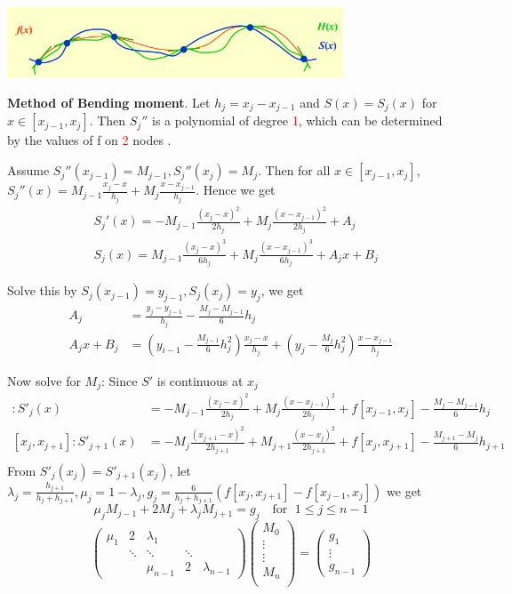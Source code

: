\documentclass[11pt]{article}
\begin{document}
\includegraphics[width=100mm]{CubicSpline}

\textbf{Method of Bending moment}. Let \(h_j=x_j-x_{j-1}\) and \(S(x)=S_j(x)\) for
\(x\in[x_{j-1}, x_j]\). Then \(S_j''\) is a polynomial of degree
\textcolor{red}{1}, which can be determined by the values of f on
\textcolor{red}{2} nodes .

Assume \(S_j''(x_{j-1})=M_{j-1},S_j''(x_j)=M_j\). Then for all
\(x\in[x_{j-1},x_j]\),
\(S_j''(x)=M_{j-1}\frac{x_j-x}{h_j}+M_j\frac{x-x_{j-1}}{h_j}\). Hence we get
\begin{align*}
&S_j'(x)=-M_{j-1}\frac{(x_j-x)^2}{2h_j}+M_j\frac{(x-x_{j-1})^2}{2h_j}+A_j\\
&S_j(x)=M_{j-1}\frac{(x_j-x)^3}{6h_j}+M_j\frac{(x-x_{j-1})^3}{6h_j}+A_jx+B_j
\end{align*}

Solve this by \(S_j(x_{j-1})=y_{j-1},S_j(x_j)=y_j\), we get
\begin{align*}
A_j&=\frac{y_j-y_{j-1}}{h_j}-\frac{M_j-M_{j-1}}{6}h_j\\
A_jx+B_j&=(y_{i-1}-\frac{M_{j-1}}{6}h_j^2)\frac{x_j-x}{h_j}+ 
(y_j-\frac{M_j}{6}h_j^2)\frac{x-x_{j-1}}{h_j}
\end{align*}

Now solve for \(M_j\): Since \(S'\) is continuous at \(x_j\)
 \begin{align*}
[x_{j-1},x_j]:S'_j(x)&=-M_{j-1}\frac{(x_j-x)^2}{2h_j}+M_j\frac{(x-x_{j-1})^2}{2h_j}
                       +f[x_{j-1},x_j]-\frac{M_j-M_{j-1}}{6}h_j\\
[x_j,x_{j+1}]:S'_{j+1}(x)&=-M_j\frac{(x_{j+1}-x)^2}{2h_{j+1}}+M_{j+1}
\frac{(x-x_j)^2}{2h_{j+1}}+f[x_j,x_{j+1}]-\frac{M_{j+1}-M_j}{6}h_{j+1}\\
\end{align*}
From \(S'_j(x_j)=S'_{j+1}(x_j)\), let \(\lambda_j=\frac{h_{j+1}}{h_j+h_{j+1}},
   \mu_j=1-\lambda_j,g_j=\frac{6}{h_j+h_{j+1}}(f[x_j,x_{j+1}]-f[x_{j-1},x_j])\)
we get
\begin{equation*}
\mu_jM_{j-1}+2M_j+\lambda_jM_{j+1}=g_j\quad\text{for } \;1\le j\le n-1
\end{equation*}
\begin{equation*}
\begin{pmatrix}
\mu_1 & 2 & \lambda_1 &&\\
& \ddots &\ddots &\ddots &\\
&&\mu_{n-1}&2&\lambda_{n-1}
\end{pmatrix}
\begin{pmatrix}
M_0\\
\vdots\\
\vdots\\
M_n\\
\end{pmatrix}=
\begin{pmatrix}
g_1\\
\vdots\\
g_{n-1}
\end{pmatrix}
\end{equation*}
\end{document}
